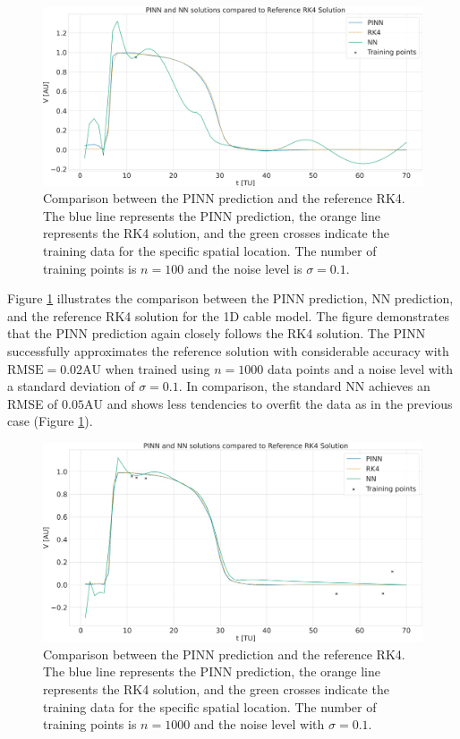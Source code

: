 \begin{figure}[H]
  \centering
  \includegraphics[width=\textwidth]{Figs/1D/V_1D_PINN_NN_100.pdf}
  \caption{Comparison between the PINN prediction and the reference RK4. The blue line represents the PINN prediction, the orange line represents the RK4 solution, and the green crosses indicate the training data for the specific spatial location. The number of training points is \( n = 100 \) and the noise level is \( \sigma = 0.1 \).}
    \label{fig:pinn_vs_rk4}
\end{figure}
Figure \ref{fig:pinn_vs_rk4} illustrates the comparison between the PINN prediction, NN prediction, and the reference RK4 solution for the 1D cable model. The figure demonstrates that the PINN prediction again closely follows the RK4 solution. The PINN successfully approximates the reference solution with considerable accuracy with $\mathrm{RMSE}=0.02\mathrm{AU}$ when trained using $n=1000$ data points and a noise level with a standard deviation of $\sigma=0.1$. In comparison, the standard NN achieves an RMSE of $0.05\mathrm{AU}$ and shows less tendencies to overfit the data as in the previous case (Figure \ref{fig:pinn_vs_rk4}).
\begin{figure}[H]
  \centering
  \includegraphics[width=\textwidth]{Figs/1D/V_1D_PINN_NN_1000.pdf}
  \caption{Comparison between the PINN prediction and the reference RK4. The blue line represents the PINN prediction, the orange line represents the RK4 solution, and the green crosses indicate the training data for the specific spatial location. The number of training points is \( n = 1000 \) and the noise level with \( \sigma = 0.1 \).}
    \label{fig:pinn_vs_rk4_1k}
\end{figure}

